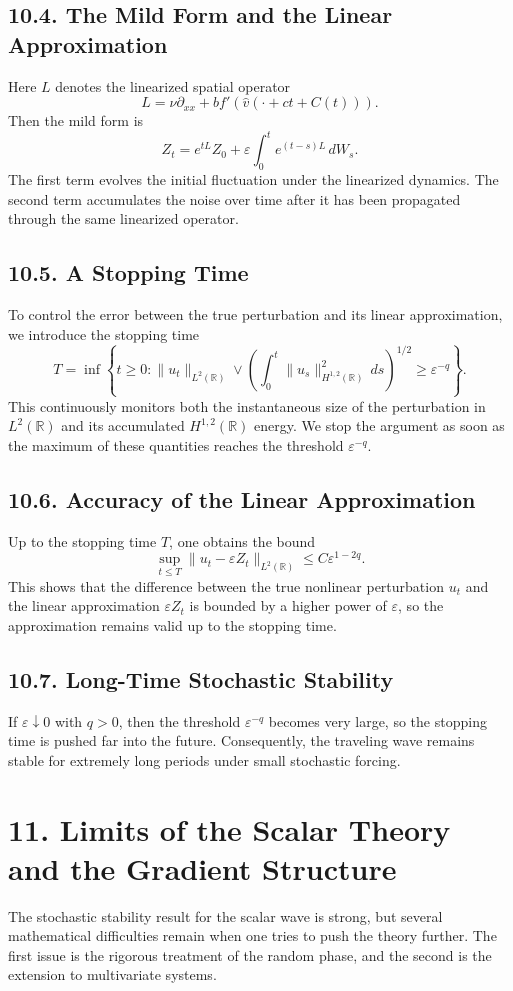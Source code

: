 \documentclass[11pt]{article}
\theoremstyle{definition}
\theoremstyle{remark}
\begin{document}
\subsection*{10.4. The Mild Form and the Linear Approximation}
Here $L$ denotes the linearized spatial operator
\[
L=\nu\partial_{xx}+bf'(\hat v(\cdot+ct+C(t))).
\]
Then the mild form is
\[
Z_t=e^{tL}Z_0+\varepsilon\int_0^t e^{(t-s)L}\,dW_s.
\]
The first term evolves the initial fluctuation under the linearized dynamics. The second term accumulates the noise over time after it has been propagated through the same linearized operator.

\subsection*{10.5. A Stopping Time}
To control the error between the true perturbation and its linear approximation, we introduce the stopping time
\[
T=\inf\left\{t\geq 0:
\|u_t\|_{L^2(\mathbb R)}
\vee
\left(\int_0^t \|u_s\|_{H^{1,2}(\mathbb R)}^2\,ds\right)^{1/2}
\geq
\varepsilon^{-q}
\right\}.
\]
This continuously monitors both the instantaneous size of the perturbation in $L^2(\mathbb R)$ and its accumulated $H^{1,2}(\mathbb R)$ energy. We stop the argument as soon as the maximum of these quantities reaches the threshold $\varepsilon^{-q}$.

\subsection*{10.6. Accuracy of the Linear Approximation}
Up to the stopping time $T$, one obtains the bound
\[
\sup_{t\leq T}\|u_t-\varepsilon Z_t\|_{L^2(\mathbb R)}
\leq
C\varepsilon^{1-2q}.
\]
This shows that the difference between the true nonlinear perturbation $u_t$ and the linear approximation $\varepsilon Z_t$ is bounded by a higher power of $\varepsilon$, so the approximation remains valid up to the stopping time.

\subsection*{10.7. Long-Time Stochastic Stability}
If $\varepsilon\downarrow 0$ with $q>0$, then the threshold $\varepsilon^{-q}$ becomes very large, so the stopping time is pushed far into the future. Consequently, the traveling wave remains stable for extremely long periods under small stochastic forcing.

\section*{11. Limits of the Scalar Theory and the Gradient Structure}
The stochastic stability result for the scalar wave is strong, but several mathematical difficulties remain when one tries to push the theory further. The first issue is the rigorous treatment of the random phase, and the second is the extension to multivariate systems.
\end{document}
